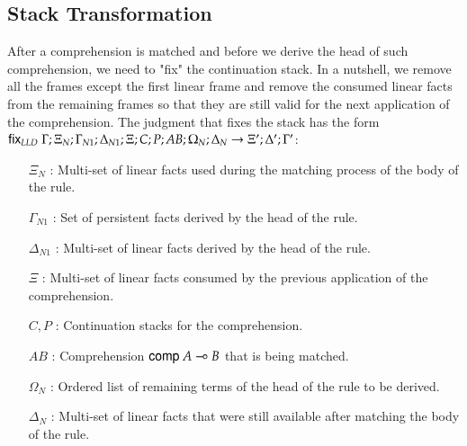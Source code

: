 \subsection{Stack Transformation}

After a comprehension is matched and before we derive the head of such comprehension, we need to "fix" the continuation stack. In a nutshell, we remove all the frames except the first linear frame and remove the consumed linear facts from the remaining frames so that they are still valid for the next application of the comprehension.
The judgment that fixes the stack has the form $\mathsf{fix}_{LLD} \; \Gamma; \Xi_N; \Gamma_{N1}; \Delta_{N1}; \Xi; C; P; AB; \Omega_N; \Delta_N \rightarrow \Xi'; \Delta'; \Gamma'$:

\begin{enumerate}
   \item[$\Xi_N$]: Multi-set of linear facts used during the matching process of the body of the rule.
   \item[$\Gamma_{N1}$]: Set of persistent facts derived by the head of the rule.
   \item[$\Delta_{N1}$]: Multi-set of linear facts derived by the head of the rule.
   \item[$\Xi$]: Multi-set of linear facts consumed by the previous application of the comprehension.
   \item[$C, P$]: Continuation stacks for the comprehension.
   \item[$AB$]: Comprehension $\mathsf{comp} \; A \multimap B$ that is being matched.
   \item[$\Omega_N$]: Ordered list of remaining terms of the head of the rule to be derived.
   \item[$\Delta_N$]: Multi-set of linear facts that were still available after matching the body of the rule.
\end{enumerate}

